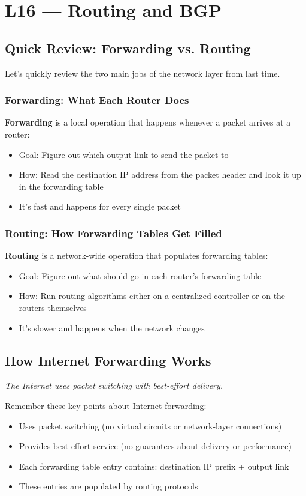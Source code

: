 \documentclass[../../compsys.tex]{subfiles}
\begin{document}
\raggedbottom
\chapter{L16 — Routing and BGP}
\vfill
\raggedbottom

\section{Quick Review: Forwarding vs. Routing}
Let's quickly review the two main jobs of the network layer from last time.

\subsection{Forwarding: What Each Router Does}
\textbf{Forwarding} is a local operation that happens whenever a packet arrives at a router:
\begin{itemize}
    \item Goal: Figure out which output link to send the packet to
    \item How: Read the destination IP address from the packet header and look it up in the forwarding table
    \item It's fast and happens for every single packet
\end{itemize}

\subsection{Routing: How Forwarding Tables Get Filled}
\textbf{Routing} is a network-wide operation that populates forwarding tables:
\begin{itemize}
    \item Goal: Figure out what should go in each router's forwarding table
    \item How: Run routing algorithms either on a centralized controller or on the routers themselves
    \item It's slower and happens when the network changes
\end{itemize}

\section{How Internet Forwarding Works}
\textit{The Internet uses packet switching with best-effort delivery.}

Remember these key points about Internet forwarding:
\begin{itemize}
    \item Uses packet switching (no virtual circuits or network-layer connections)
    \item Provides best-effort service (no guarantees about delivery or performance)
    \item Each forwarding table entry contains: destination IP prefix + output link
    \item These entries are populated by routing protocols
\end{itemize}
\end{document}
